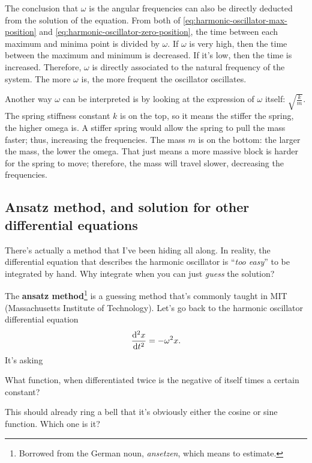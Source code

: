 The conclusion that \(\omega\) is the angular frequencies can also be directly deducted from the solution of the equation. From both of \cref{eq:harmonic-oscillator-max-position} and \cref{eq:harmonic-oscillator-zero-position}, the time between each maximum and minima point is divided by \(\omega\). If \(\omega\) is very high, then the time between the maximum and minimum is decreased. If it's low, then the time is increased. Therefore, \(\omega\) is directly associated to the natural frequency of the system. The more \(\omega\) is, the more frequent the oscillator oscillates.

Another way \(\omega\) can be interpreted is by looking at the expression of \(\omega\) itself: \(\sqrt{\frac{k}{m}}\). The spring stiffness constant \(k\) is on the top, so it means the stiffer the spring, the higher omega is. A stiffer spring would allow the spring to pull the mass faster; thus, increasing the frequencies. The mass \(m\) is on the bottom: the larger the mass, the lower the omega. That just means a more massive block is harder for the spring to move; therefore, the mass will travel slower, decreasing the frequencies.

\subsection{Ansatz method, and solution for other differential equations}

There's actually a method that I've been hiding all along. In reality, the differential equation that describes the harmonic oscillator is \enquote{\emph{too easy}} to be integrated by hand. Why integrate when you can just \emph{guess} the solution?

The \textbf{ansatz method}\footnote{Borrowed from the German noun, \emph{ansetzen}, which means to estimate.} is a guessing method that's commonly taught in MIT (Massachusetts Institute of Technology). Let's go back to the harmonic oscillator differential equation
\begin{equation}
  \odv[ord = 2]{x}{t} = -\omega^2 x.
\end{equation}
It's asking
\begin{displayquote}
  What function, when differentiated twice is the negative of itself times a certain constant?
\end{displayquote}
This should already ring a bell that it's obviously either the cosine or sine function. Which one is it?

